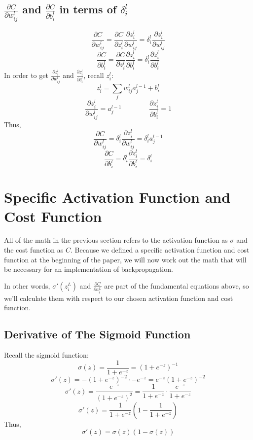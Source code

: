 \documentclass[11pt]{article}
\begin{document}
\subsection{$\frac{\partial C}{\partial w_{ij}^l}$ and $\frac{\partial C}{\partial b_i^l}$ in terms of $\delta_i^l$}

\[\frac{\partial C}{\partial w_{ij}^l} = \frac{\partial C}{\partial z_i^l} \frac{\partial z_i^l}{\partial w_{ij}^l} = \delta_i^l \frac{\partial z_i^l}{\partial w_{ij}^l}\]
\[\frac{\partial C}{\partial b_i^l} = \frac{\partial C}{\partial z_i^l} \frac{\partial z_i^l}{\partial b_i^l} = \delta_i^l \frac{\partial z_i^l}{\partial b_i^l}\]
In order to get $\frac{\partial z_i^l}{\partial w_{ij}^l}$ and $\frac{\partial z_i^l}{\partial b_i^l}$, recall $z_i^l$:
\[z_i^l = \sum_j w_{ij}^l a_j^{l - 1} + b_i^l\]
\[\frac{\partial z_i^l}{\partial w_{ij}^l} = a_j^{l - 1}
\qquad \qquad 
\frac{\partial z_i^l}{\partial b_i^l} = 1\]
Thus,
\[\frac{\partial C}{\partial w_{ij}^l} = \delta_i^l \frac{\partial z_i^l}{\partial w_{ij}^l} = \delta_i^l a_j^{l - 1}\]
\[\frac{\partial C}{\partial b_i^l} = \delta_i^l \frac{\partial z_i^l}{\partial b_i^l} = \delta_i^l\]

\section{Specific Activation Function and Cost Function}

All of the math in the previous section refers to the activation function as $\sigma$ and the cost function as $C$. Because we defined a specific activation function and cost function at the beginning of the paper, we will now work out the math that will be necessary for an implementation of backpropagation.

In other words, $\sigma'(z_i^L)$ and $\frac{\partial C}{\partial a_i^L}$ are part of the fundamental equations above, so we'll calculate them with respect to our chosen activation function and cost function.

\subsection{Derivative of The Sigmoid Function}
Recall the sigmoid function:
\[\sigma(z) = \frac{1}{1 + e^{-z}} = \left(1 + e^{-z}\right)^{-1}\]
\[\sigma'(z) = -\left(1 + e^{-z}\right)^{-2} \cdot -e^{-z} = e^{-z} \left(1 + e^{-z}\right)^{-2}\]
\[\sigma'(z) = \frac{e^{-z}}{\left(1 + e^{-z}\right)^{2}} = \frac{1}{1 + e^{-z}} \cdot \frac{e^{-z}}{1 + e^{-z}}\]
\[\sigma'(z) = \frac{1}{1 + e^{-z}} \left(1 - \frac{1}{1 + e^{-z}}\right)\]
Thus,
\[\sigma'(z) = \sigma(z) \left(1 - \sigma(z)\right)\]
\end{document}

